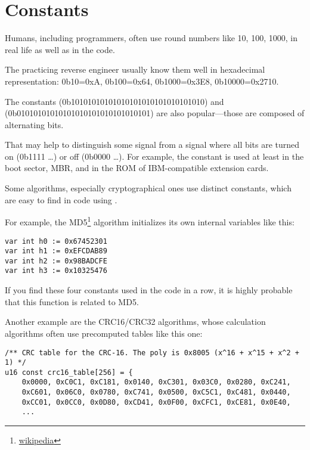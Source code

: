 \section{Constants}

Humans, including programmers, often use round numbers like 10, 100, 1000, 
in real life as well as in the code.

The practicing reverse engineer usually know them well in hexadecimal representation:
0b10=0xA, 0b100=0x64, 0b1000=0x3E8, 0b10000=0x2710.

The constants  (0b10101010101010101010101010101010) and \\
 (0b01010101010101010101010101010101)  are also popular---those
are composed of alternating bits.

That may help to distinguish some signal from a signal where all bits are turned on (0b1111 \dots) or off (0b0000 \dots).
For example, the  constant
is used at least in the boot sector, \ac{MBR}, 
and in the \ac{ROM} of IBM-compatible extension cards.

Some algorithms, especially cryptographical ones use distinct constants, which are easy to find
in code using \IDA.

\newcommand{\URLMD}{http://go.yurichev.com/17111}

For example, the MD5\footnote{\href{\URLMD}{wikipedia}} algorithm initializes its own internal variables like this:

\begin{verbatim}
var int h0 := 0x67452301
var int h1 := 0xEFCDAB89
var int h2 := 0x98BADCFE
var int h3 := 0x10325476
\end{verbatim}

If you find these four constants used in the code in a row, it is highly probable that this function is related to MD5.

\par Another example are the CRC16/CRC32 algorithms, 
whose calculation algorithms often use precomputed tables like this one:

\begin{lstlisting}[caption=linux/lib/crc16.c]
/** CRC table for the CRC-16. The poly is 0x8005 (x^16 + x^15 + x^2 + 1) */
u16 const crc16_table[256] = {
	0x0000, 0xC0C1, 0xC181, 0x0140, 0xC301, 0x03C0, 0x0280, 0xC241,
	0xC601, 0x06C0, 0x0780, 0xC741, 0x0500, 0xC5C1, 0xC481, 0x0440,
	0xCC01, 0x0CC0, 0x0D80, 0xCD41, 0x0F00, 0xCFC1, 0xCE81, 0x0E40,
	...
\end{lstlisting}

